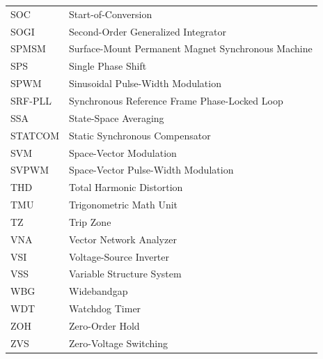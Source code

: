 \begin{longtable}{@{}p{3.5cm}p{10.5cm}@{}}
SOC & Start-of-Conversion \\
SOGI & Second-Order Generalized Integrator \\
SPMSM & Surface-Mount Permanent Magnet Synchronous Machine \\
SPS & Single Phase Shift \\
SPWM & Sinusoidal Pulse-Width Modulation \\
SRF-PLL & Synchronous Reference Frame Phase-Locked Loop \\
SSA & State-Space Averaging \\
STATCOM & Static Synchronous Compensator \\
SVM & Space-Vector Modulation \\
SVPWM & Space-Vector Pulse-Width Modulation \\
THD & Total Harmonic Distortion \\
TMU & Trigonometric Math Unit \\
TZ & Trip Zone \\
VNA & Vector Network Analyzer \\
VSI & Voltage-Source Inverter \\
VSS & Variable Structure System \\
WBG & Widebandgap \\
WDT & Watchdog Timer \\
ZOH & Zero-Order Hold \\
ZVS & Zero-Voltage Switching \\
\end{longtable}

